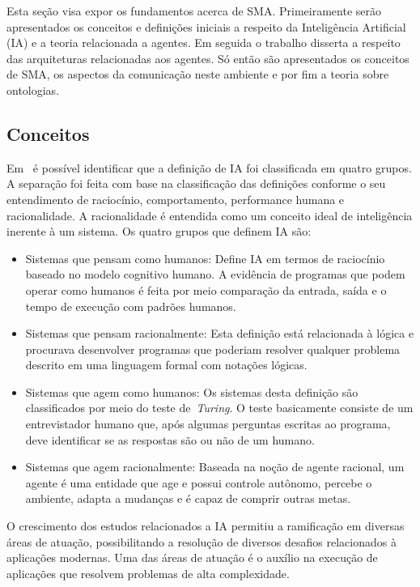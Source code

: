 Esta seção visa expor os fundamentos acerca de SMA. Primeiramente serão apresentados os conceitos e definições iniciais a respeito da Inteligência Artificial (IA) e a teoria relacionada a agentes. Em seguida o trabalho disserta a respeito das arquiteturas relacionadas aos agentes. Só então são apresentados os conceitos de SMA, os aspectos da comunicação neste ambiente e por fim a teoria sobre ontologias.

\subsection{Conceitos}

Em~\cite{novig95} é possível identificar que a definição de IA foi classificada em quatro grupos. A separação foi feita com base na classificação das definições conforme o seu entendimento de raciocínio, comportamento, performance humana e racionalidade. A racionalidade é entendida como um conceito ideal de inteligência inerente à um sistema. Os quatro grupos que definem IA são:

\begin{itemize}
	\item Sistemas que pensam como humanos: Define IA em termos de raciocínio baseado no modelo cognitivo humano. A evidência de programas que podem operar como humanos é feita por meio comparação da entrada, saída e o tempo de execução com padrões humanos.
	\item Sistemas que pensam racionalmente: Esta definição está relacionada à lógica e procurava desenvolver programas que poderiam resolver qualquer problema descrito em uma linguagem formal com notações lógicas.
	\item Sistemas que agem como humanos: Os sistemas desta definição são classificados por meio do teste de~\emph{Turing}. O teste basicamente consiste de um entrevistador humano que, após algumas perguntas escritas ao programa, deve identificar se as respostas são ou não de um humano.
	\item Sistemas que agem racionalmente: Baseada na noção de agente racional, um agente é uma entidade que age e possui controle autônomo, percebe o ambiente, adapta a mudanças e é capaz de comprir outras metas.
\end{itemize}

O crescimento dos estudos relacionados a IA permitiu a ramificação em diversas áreas de atuação, possibilitando a resolução de diversos desafios relacionados à aplicações modernas. Uma das áreas de atuação é o auxílio na execução de aplicações que resolvem problemas de alta complexidade. 

